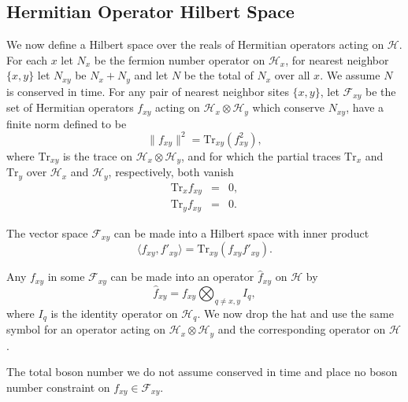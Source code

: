 \documentclass[12pt,amsmath,amssymb,onecolumn]{revtex4-2}
\begin{document}
\subsection{\label{subsec:operatorspace} Hermitian Operator Hilbert Space}

We now define a Hilbert space over the reals of Hermitian operators
acting on $\mathcal{H}$. 
For each $x$ let $N_x$ be the fermion number operator on $\mathcal{H}_x$,
for nearest neighbor $\{x, y\}$
let $N_{xy}$ be $N_x + N_y$ and 
let $N$ be the total of $N_x$ over all $x$. 
We assume $N$ is conserved in time.
For any pair of nearest neighbor sites $ \{x, y\}$, let
$\mathcal{F}_{x y}$ be the set of Hermitian operators
$f_{xy}$ acting on
$\mathcal{H}_x \otimes \mathcal{H}_y$  which
conserve $N_{xy}$, have a finite
norm defined to be
\begin{equation}
  \label{normf}
  \parallel f_{xy} \parallel ^ 2 = \mathrm{Tr}_{xy}( f_{xy}^2),
\end{equation}
where $\mathrm{Tr}_{xy}$ is the trace on $\mathcal{H}_x \otimes \mathcal{H}_y$,
and for which the partial traces $\mathrm{Tr}_x$ and $\mathrm{Tr}_y$ over $\mathcal{H}_x$
and $\mathcal{H}_y$, respectively, both vanish
\begin{subequations}
\begin{eqnarray}
  \label{trx}
  \mathrm{Tr}_x f_{xy} & = & 0, \\
  \label{try}
  \mathrm{Tr}_y f_{xy} & = & 0.
\end{eqnarray}
\end{subequations}

The vector space $\mathcal{F}_{x y}$ can be made into a Hilbert space
with inner product
\begin{equation}
  \label{ffprime}
   \langle  f_{xy}, f'_{xy} \rangle  = \mathrm{Tr}_{xy}( f_{xy} f'_{xy}).
\end{equation}

Any $f_{xy}$ in some $\mathcal{F}_{xy}$ can be made into an
operator $\hat{ f}_{xy}$ on $\mathcal{H}$ by
\begin{equation}
\label{defhf}
\hat{ f}_{xy} =  f_{xy} \bigotimes_{q \ne x,y} I_q, 
\end{equation}
where $I_q$ is the identity operator on $\mathcal{H}_q$.
We now drop the hat and use the same symbol for an operator  
acting on $\mathcal{H}_x \otimes \mathcal{H}_y$
and the corresponding operator on $\mathcal{H}$.

The total boson number we do not assume conserved
in time and place no boson number
constraint on $f_{xy} \in \mathcal{F}_{xy}$. 
\end{document}
